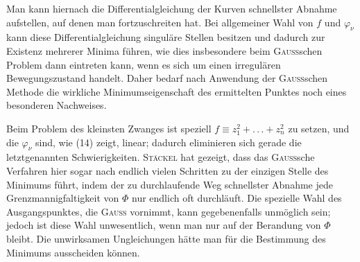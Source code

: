 Man kann hiernach die Differentialgleichung der Kurven schnellster Abnahme
aufstellen, auf denen man fortzuschreiten hat. Bei allgemeiner Wahl
von $f$ und $\varphi_\nu$ kann diese Differentialgleichung singuläre Stellen besitzen und
dadurch zur Existenz mehrerer Minima führen, wie dies insbesondere beim
\textsc{Gauss}schen Problem dann eintreten kann, wenn es sich um einen irregulären
Bewegungszustand handelt. Daher bedarf nach Anwendung der \textsc{Gauss}schen
Methode die wirkliche Minimumseigenschaft des ermittelten Punktes noch
eines besonderen Nachweises.

Beim Problem des kleinsten Zwanges ist speziell $f\equiv z_1^2+ .\, .\, .+z_n^2$ zu setzen,
und die $\varphi_\nu$ sind, wie (14) zeigt, linear; dadurch eliminieren sich gerade die
letztgenannten Schwierigkeiten. \textsc{Stäckel} hat gezeigt, dass das \textsc{Gauss}sche Verfahren
hier sogar nach endlich vielen Schritten zu der einzigen Stelle des
Minimums führt, indem der zu durchlaufende Weg schnellster Abnahme jede
Grenzmannigfaltigkeit von $\Phi$ nur endlich oft durchläuft. Die spezielle Wahl
des Ausgangspunktes, die \textsc{Gauss} vornimmt, kann gegebenenfalls unmöglich
sein; jedoch ist diese Wahl unwesentlich, wenn man nur auf der Berandung
von $\Phi$ bleibt. Die unwirksamen Ungleichungen hätte man für die Bestimmung
des Minimums ausscheiden können.

